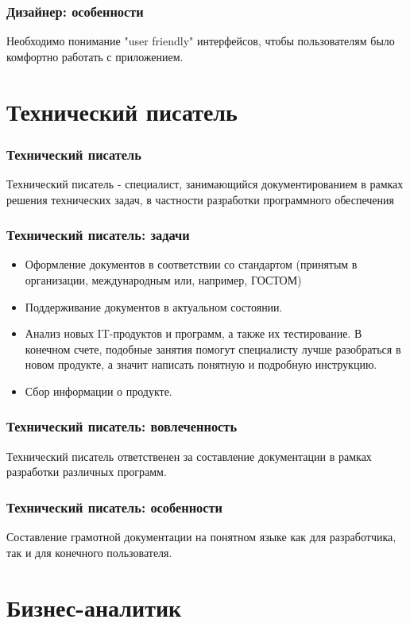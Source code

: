 \documentclass{../industrial-development}
\begin{document}
	\begin{frame} \frametitle{Дизайнер: особенности}
		Необходимо понимание "user friendly" интерфейсов, чтобы пользователям было комфортно работать с приложением.
	\end{frame}
	
	\section{Технический писатель }
	
	\begin{frame} \frametitle{Технический писатель}
		\begin{block}{}
			\alert {Технический писатель} - специалист, занимающийся документированием в рамках решения технических задач, в частности разработки программного обеспечения
		\end{block}
	\end{frame}
	
	\begin{frame} \frametitle{Технический писатель: задачи}
		\begin{itemize}
			\item Оформление документов в соответствии со стандартом (принятым в организации, международным или, например, ГОСТОМ)
			\item Поддерживание документов в актуальном состоянии.
			\item Анализ новых IT-продуктов и программ, а также их тестирование. В конечном счете, подобные занятия помогут специалисту лучше разобраться в новом продукте, а значит написать понятную и подробную инструкцию.
			\item Сбор информации о продукте.
		\end{itemize}
	\end{frame}
	\begin{frame} \frametitle{Технический писатель: вовлеченность}
		Технический писатель ответственен за составление документации в рамках разработки различных программ.
	\end{frame}
	
	\begin{frame} \frametitle{Технический писатель: особенности}
		Составление грамотной документации на понятном языке как для разработчика, так и для конечного пользователя.
	\end{frame}
	
	\section{Бизнес-аналитик}
	
\end{document}
